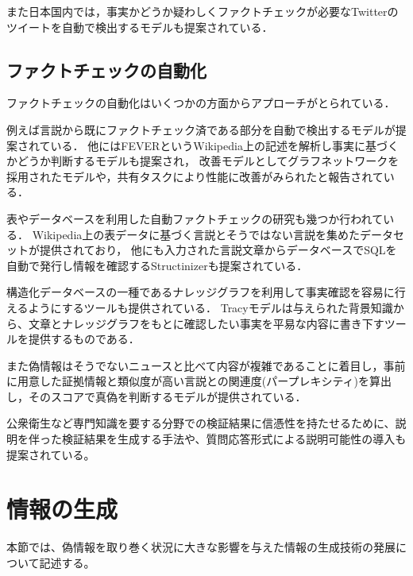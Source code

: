 また日本国内では，事実かどうか疑わしくファクトチェックが必要なTwitterのツイートを自動で検出するモデルも提案されている\cite{内山香2018}．

\subsection{ファクトチェックの自動化}
ファクトチェックの自動化はいくつかの方面からアプローチがとられている．

例えば言説から既にファクトチェック済である部分を自動で検出するモデル\cite{shaar-etal-2020-known}が提案されている．
他にはFEVERというWikipedia上の記述を解析し事実に基づくかどうか判断するモデルも提案され\cite{thorne-etal-2018-fever}，
改善モデルとしてグラフネットワークを採用されたモデル\cite{zhong-etal-2020-reasoning}や，共有タスクにより性能に改善がみられたと報告されている\cite{thorne-etal-2019-fever2}．

表やデータベースを利用した自動ファクトチェックの研究も幾つか行われている．
Wikipedia上の表データに基づく言説とそうではない言説を集めたデータセットが提供されており\cite{chen2020tabfact}，
他にも入力された言説文章からデータベースでSQLを自動で発行し情報を確認するStructinizer\cite{10.14778/3407790.3407841}も提案されている．

構造化データベースの一種であるナレッジグラフを利用して事実確認を容易に行えるようにするツールも提供されている．
Tracyモデルは与えられた背景知識から、文章とナレッジグラフをもとに確認したい事実を平易な内容に書き下すツールを提供するものである\cite{10.1145/3308558.3314126}．

また偽情報はそうでないニュースと比べて内容が複雑であることに着目し，事前に用意した証拠情報と類似度が高い言説との関連度(パープレキシティ)を算出し，そのスコアで真偽を判断するモデルが提供されている\cite{lee2020misinformation}．

公衆衛生など専門知識を要する分野での検証結果に信憑性を持たせるために、説明を伴った検証結果を生成する手法\cite{kotonya-toni-2020-explainable-automated}や、質問応答形式による説明可能性の導入\cite{9747214}も提案されている。


\section{情報の生成}
本節では、偽情報を取り巻く状況に大きな影響を与えた情報の生成技術の発展について記述する。

